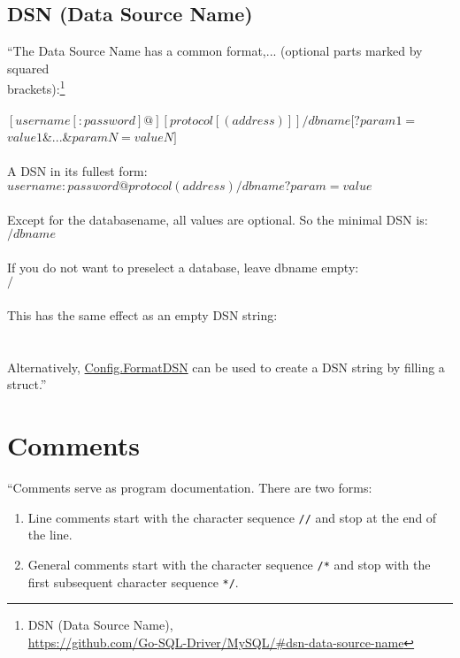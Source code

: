 \documentclass[12pt,letterpaper,dvips]{article}
\begin{document}
\subsection{DSN (Data Source Name)}
``The Data Source Name has a common format,... (optional
parts marked by squared\\
brackets):\footnote{DSN (Data Source Name),\\
  \href{https://github.com/Go-SQL-Driver/MySQL/\#dsn-data-source-name}{https://github.com/Go-SQL-Driver/MySQL/\#dsn-data-source-name}}\\
\\
\indent $[username[:password]@][protocol[(address)]]/dbname[?param1=$\\
\indent \indent $value1$\&$...$\&$paramN=valueN]$\\
\\
A DSN in its fullest form:\\
\indent $username:password@protocol(address)/dbname?param=value$\\
\\
Except for the databasename, all values are optional. So the minimal DSN is:\\
\indent $/dbname$\\
\\
If you do not want to preselect a database, leave dbname empty:\\
\indent $/$\\
\\
This has the same effect as an empty DSN string:\\
\\
\\
Alternatively,
\href{https://godoc.org/github.com/go-sql-driver/mysql\#Config.FormatDSN}{Config.FormatDSN}
can be used to create a DSN string by filling a struct.''



\newpage
\section{Comments}
``Comments serve as program documentation. There are two
forms:

\begin{enumerate}
    \item Line comments start with the character sequence
      \texttt{//} and stop at the end of the line.
    \item General comments start with the character sequence
        \texttt{/*} and stop with the first subsequent
        character sequence \texttt{*/}.
\end{enumerate}
\end{document}
